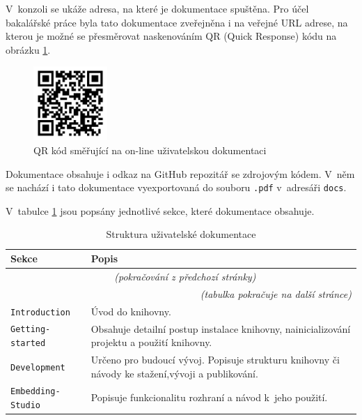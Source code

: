 \documentclass[czech, bc, kiv, he, iso690numb]{fasthesis}
\begin{document}
V~konzoli se ukáže adresa, na které je dokumentace spuštěna. Pro účel bakalářské práce byla tato dokumentace
zveřejněna i na veřejné URL adrese, na kterou je možné se přesměrovat naskenováním QR (Quick Response) kódu na obrázku \ref{fig:qrCode}.

\begin{figure}[h]
	\centering
	\includegraphics[width=0.25\textwidth]{pictures/QR.pdf}
	\caption{QR kód směřující na on-line uživatelskou dokumentaci}
	\label{fig:qrCode}
\end{figure}

Dokumentace obsahuje i odkaz na GitHub repozitář se zdrojovým kódem. V~něm se nachází i tato dokumentace vyexportovaná do souboru \texttt{.pdf} v~adresáři \texttt{docs}. 


V~tabulce \ref{tab:docsTabs} jsou popsány jednotlivé sekce, které dokumentace obsahuje.

	\begin{longtable}{p{}p{}}
	\caption{Struktura uživatelské dokumentace}
	\label{tab:docsTabs}\\
	\toprule[1.5pt]
	\textbf{Sekce} & \textbf{Popis}\\
	\midrule
	\endfirsthead
	\multicolumn{2}{c}{\tablename{}~\thetable{} \textit{(pokračování z předchozí stránky)}}\\
	\endhead
	\midrule
	\multicolumn{2}{r}{\textit{(tabulka pokračuje na další stránce)}}\\
	\endfoot
	\bottomrule[1.5pt]
	\endlastfoot
	\verb"Introduction" & Úvod do knihovny. \\
	\midrule
	\verb"Getting-started" & Obsahuje detailní postup instalace knihovny, nainicializování projektu a použití knihovny. \\
	\midrule
	\verb"Development" & Určeno pro budoucí vývoj. Popisuje strukturu knihovny či návody ke stažení,vývoji a publikování.\\
	\midrule
	\verb"Embedding-Studio" & Popisuje funkcionalitu rozhraní a návod k~jeho použití. \\
	\end{longtable}
\end{document}

